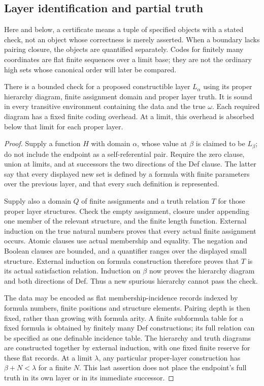 \subsection{Layer identification and partial truth}\label{sec:truth-coding}
Here and below, a certificate means a tuple of specified objects with
a stated check, not an object whose correctness is merely asserted.
When a boundary lacks pairing closure, the objects are quantified
separately. Codes for finitely many coordinates are flat finite sequences
over a limit base; they are not the ordinary high sets whose canonical
order will later be compared.

\begin{lemma}\label{lem:layers}
There is a bounded check for a proposed constructible layer $L_\alpha$
using its proper hierarchy diagram, finite assignment domain and proper
layer truth. It is sound in every transitive environment containing the
data and the true $\omega$. Each required diagram has a fixed finite
coding overhead. At a limit, this overhead is absorbed below that limit
for each proper layer.
\end{lemma}
\begin{proof}
Supply a function $H$ with domain $\alpha$, whose value at $\beta$ is
claimed to be $L_\beta$; do not include the endpoint as a self-referential
pair. Require the zero clause, union at limits, and at successors the
two directions of the Def clause. The latter say that every displayed
new set is defined by a formula with finite parameters over the previous
layer, and that every such definition is represented.

Supply also a domain $Q$ of finite assignments and a truth relation $T$
for those proper layer structures. Check the empty assignment, closure
under appending one member of the relevant structure, and the finite
length function. External induction on the true natural numbers proves
that every actual finite assignment occurs. Atomic clauses use actual
membership and equality. The negation and Boolean clauses are bounded,
and a quantifier ranges over the displayed small structure. External
induction on formula construction therefore proves that $T$ is its
actual satisfaction relation. Induction on $\beta$ now proves the
hierarchy diagram and both directions of Def. Thus a new spurious
hierarchy cannot pass the check.

The data may be encoded as flat membership-incidence records indexed by
formula numbers, finite positions and structure elements. Pairing depth
is then fixed, rather than growing with formula arity. A finite
subformula table for a fixed formula is obtained by finitely many Def
constructions; its full relation can be specified as one definable
incidence table. The hierarchy and truth diagrams are constructed
together by external induction, with one fixed finite reserve for these
flat records. At a limit $\lambda$, any particular proper-layer
construction has $\beta+N<\lambda$ for a finite $N$. This last assertion
does not place the endpoint's full truth in its own layer or in its
immediate successor.
\end{proof}

